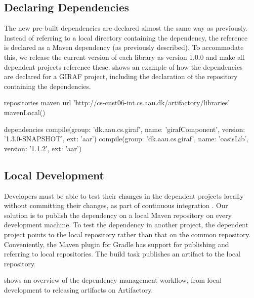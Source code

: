 \subsection{Declaring Dependencies}
The new pre-built dependencies are declared almost the same way as previously. Instead of referring to a local directory containing the dependency, the reference is declared as a Maven dependency (as previously described). To accommodate this, we release the current version of each library as version 1.0.0 and make all dependent projects reference these.  shows an example of how the dependencies are declared for a GIRAF project, including the declaration of the repository containing the dependencies.

\begin{gradlecode}[caption={Dependency declaration for a GIRAF project},label={lst:dependency_declaration_giraf}]
repositories {
    maven {
        url 'http://cs-cust06-int.cs.aau.dk/artifactory/libraries'
    }
    mavenLocal()
}

dependencies {
    compile(group: 'dk.aau.cs.giraf', name: 'girafComponent', version: '1.3.0-SNAPSHOT', ext: 'aar')
    compile(group: 'dk.aau.cs.giraf', name: 'oasisLib', version: '1.1.2', ext: 'aar')
}
\end{gradlecode}

\subsection{Local Development}
Developers must be able to test their changes in the dependent projects locally without committing their changes, as part of continuous integration \parencite{fowlerCI}. Our solution is to publish the dependency on a local Maven repository on every development machine. To test the dependency in another project, the dependent project points to the local repository rather than that on the common repository. Conveniently, the Maven plugin for Gradle has support for publishing and referring to local repositories. The build task  publishes an artifact to the local repository.

 shows an overview of the dependency management workflow, from local development to releasing artifacts on Artifactory.

